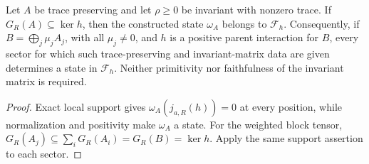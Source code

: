 \begin{lemma}
    \label{thm:mps_quasi_local_parent_ground_state_face_membership}
    \leanok
    Let $A$ be trace preserving and let $\rho\ge0$ be invariant with
    nonzero trace. If $G_R(A)\subseteq\ker h$, then the constructed
    state $\omega_A$ belongs to $\mathcal F_h$.
    Consequently, if $B=\bigoplus_j\mu_jA_j$, with all $\mu_j\ne0$, and
    $h$ is a positive parent interaction for $B$, every sector for which
    such trace-preserving and invariant-matrix data are given determines
    a state in $\mathcal F_h$. Neither primitivity nor faithfulness of
    the invariant matrix is required.
\end{lemma}
\begin{proof}
    \leanok
    Exact local support gives $\omega_A(j_{a,R}(h))=0$ at every position,
    while normalization and positivity make $\omega_A$ a state.
    For the weighted block tensor,
    $G_R(A_j)\subseteq\sum_iG_R(A_i)=G_R(B)=\ker h$.
    Apply the same support assertion to each sector.
\end{proof}

